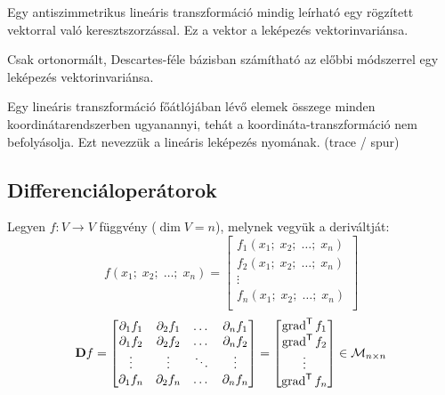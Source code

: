 \documentclass[main.tex]{subfiles}
\begin{document}
Egy antiszimmetrikus lineáris transzformáció
mindig leírható egy rögzített vektorral
való keresztszorzással. Ez a vektor a leképezés
vektorinvariánsa.



Csak ortonormált, Descartes-féle bázisban
számítható az előbbi módszerrel egy leképezés
vektorinvariánsa.



Egy lineáris transzformáció főátlójában lévő
elemek összege minden koordinátarendszerben
ugyanannyi, tehát a koordináta-transzformáció
nem befolyásolja. Ezt nevezzük a lineáris
leképezés nyomának. (trace / spur)

\subsection{Differenciáloperátorok}

Legyen $f: V \rightarrow V$ függvény ($\dim V = n$),
melynek vegyük a deriváltját:
\begin{equation*}
  f \left( x_1; \; x_2; \; \dots ; \; x_n \right)
  =
  \begin{bmatrix}
    f_1 \left( x_1; \; x_2; \; \dots ; \; x_n \right) \\
    f_2 \left( x_1; \; x_2; \; \dots ; \; x_n \right) \\
    \vdots                                            \\
    f_n \left( x_1; \; x_2; \; \dots ; \; x_n \right) \\
  \end{bmatrix}
\end{equation*}
\begin{equation*}
  \mathbf{D} f
  =
  \begin{bmatrix}
    \partial_1 f_1 & \partial_2 f_1 & \dots  & \partial_n f_1 \\
    \partial_1 f_2 & \partial_2 f_2 & \dots  & \partial_n f_2 \\
    \vdots         & \vdots         & \ddots & \vdots         \\
    \partial_1 f_n & \partial_2 f_n & \dots  & \partial_n f_n
  \end{bmatrix}
  =
  \begin{bmatrix}
    \operatorname{grad}^{\mathsf{T}} f_1 \\
    \operatorname{grad}^{\mathsf{T}} f_2 \\
    \vdots               \\
    \operatorname{grad}^{\mathsf{T}} f_n \\
  \end{bmatrix}
  \in
  \mathcal{M}_{n \times n}
\end{equation*}
\end{document}
